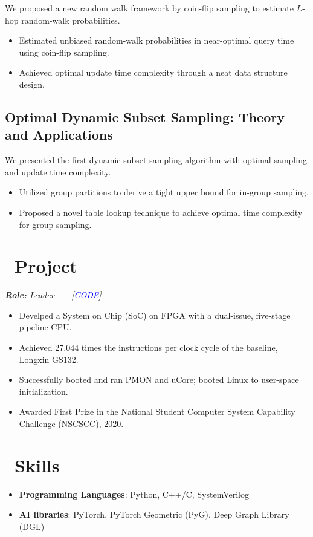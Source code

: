 \documentclass{resume}
\begin{document}
We proposed a new random walk framework by coin-flip sampling to estimate $L$-hop random-walk probabilities.
\begin{itemize}
  \item Estimated unbiased random-walk probabilities in near-optimal query time using coin-flip sampling.
  \item Achieved optimal update time complexity through a neat data structure design.
\end{itemize}

\subsection{\bf Optimal Dynamic Subset Sampling: Theory and Applications} 

We presented the first dynamic subset sampling algorithm with optimal sampling and update time complexity.
\begin{itemize}
  \item Utilized group partitions to derive a tight upper bound for in-group sampling.
  \item Proposed a novel table lookup technique to achieve optimal time complexity for group sampling.
\end{itemize}




\section{\faHeartO\ Project}
 {\it{\textbf{Role:} Leader}~~~~[\href{https://github.com/easter-mips}{\textcolor{blue}{\underline{CODE}}}]}

\begin{itemize}
  \item Develped a System on Chip (SoC) on FPGA with a dual-issue, five-stage pipeline CPU. 
  \item Achieved 27.044 times the instructions per clock cycle of the baseline, Longxin GS132.
  \item Successfully booted and ran PMON and uCore; booted Linux to user-space initialization.
  \item Awarded First Prize in the National Student Computer System Capability Challenge (NSCSCC), 2020.
\end{itemize}

\section{\faCogs\ Skills}
\begin{itemize}[parsep=0.5ex]
  \item {\bf Programming Languages}: Python, C++/C, SystemVerilog
  \item {\bf AI libraries}: PyTorch, PyTorch Geometric (PyG), Deep Graph Library (DGL) 
\end{itemize}
\end{document}
